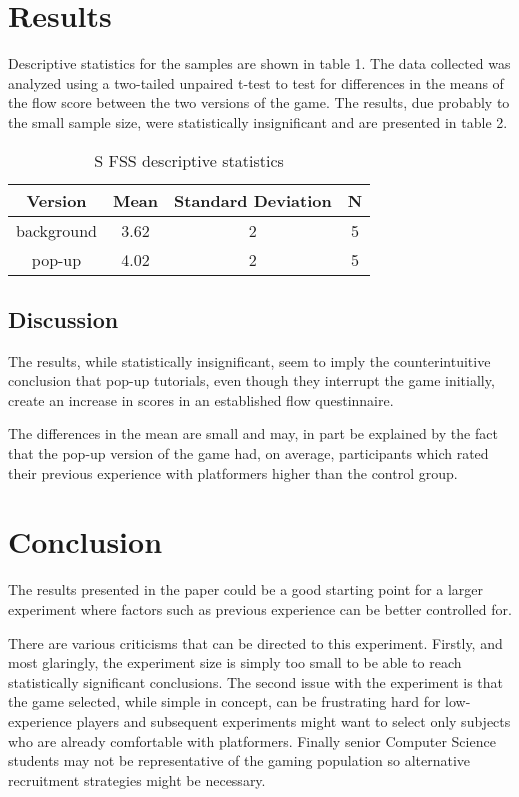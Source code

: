 \documentclass{acmsiggraph}
\begin{document}
\section{Results}

Descriptive statistics for the samples are shown in table 1. The data collected was analyzed using a two-tailed unpaired t-test to test for differences in the means of the flow score between the two versions of the game. The results, due probably to the small sample size, were statistically insignificant and are presented in table 2.

\begin{table}[ht]
  \centering
  \caption{S FSS descriptive statistics}
  \begin{tabular}{|c|c|c|c|}
  	\hline
  	\textbf{Version} & \textbf{Mean} & \textbf{Standard Deviation} & \textbf{N}\\
    \hline
    background & 3.62 & 2 & 5 \\
	pop-up & 4.02 & 2 & 5 \\
    \hline
  \end{tabular}
\end{table}

\subsection{Discussion}
The results, while statistically insignificant, seem to imply the counterintuitive conclusion that pop-up tutorials, even though they interrupt the game initially, create an increase in scores in an established flow questinnaire.

The differences in the mean are small and may, in part be explained by the fact that the pop-up version of the game had, on average, participants which rated their previous experience with platformers higher than the control group. 

\section{Conclusion}
The results presented in the paper could be a good starting point for a larger experiment where factors such as previous experience can be better controlled for.

There are various criticisms that can be directed to this experiment. Firstly, and most glaringly, the experiment size is simply too small to be able to reach statistically significant conclusions. The second issue with the experiment is that the game selected, while simple in concept, can be frustrating hard for low-experience players and subsequent experiments might want to select only subjects who are already comfortable with platformers. Finally senior Computer Science students may not be representative of the gaming population so alternative recruitment strategies might be necessary.
\end{document}
